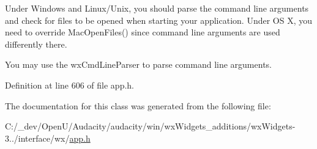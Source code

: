 Under Windows and Linux/\+Unix, you should parse the command line arguments and check for files to be opened when starting your application. Under OS X, you need to override Mac\+Open\+Files() since command line arguments are used differently there.

You may use the wx\+Cmd\+Line\+Parser to parse command line arguments. 

Definition at line 606 of file app.\+h.



The documentation for this class was generated from the following file\+:\begin{DoxyCompactItemize}
\item 
C\+:/\+\_\+dev/\+Open\+U/\+Audacity/audacity/win/wx\+Widgets\+\_\+additions/wx\+Widgets-\/3../interface/wx/\hyperlink{app_8h}{app.\+h}\end{DoxyCompactItemize}
